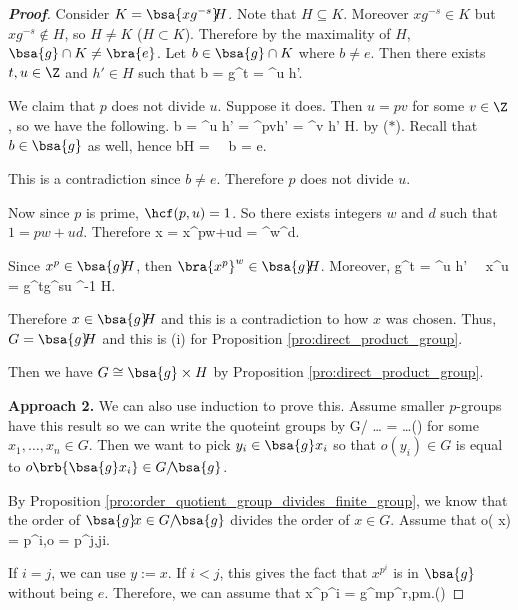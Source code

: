 \begin{proof}[\bf Proof]
Consider $K =\bsa{xg^{-s}}\!\! H$. Note that $H\subseteq K$. Moreover $xg^{-s}\in K$ but $xg^{-s} \notin H$, so $H\neq K$ ($H\subset K$). Therefore by the maximality of $H$, $\bsa{g}\cap K \neq \bra{e}$. Let $b\in \bsa{g}\cap K$ where $b\neq e$. Then there exists $t,u\in \Z$ and $h'\in H$ such that
\be
b = g^t = ^u h'.
\ee

We claim that $p$ does not divide $u$. Suppose it does. Then $u = pv$ for some $v\in \Z$, so we have the following.
\be
b = ^u h' = ^{pv}h' = ^v h' \in H.
\ee
by ($*$). Recall that $b\in \bsa{g}$ as well, hence
\be
b\in {}\cap H =  \ \ra \ b = e.
\ee

This is a contradiction since $b\neq e$. Therefore $p$ does not divide $u$.

Now since $p$ is prime, $\hcf(p,u)=1$. So there exists integers $w$ and $d$ such that $1 = pw+ud$. Therefore
\be
x = x^{pw+ud} = ^w^d.
\ee

Since $x^p \in \bsa{g}\!\! H$, then $\bra{x^p}^w\in \bsa{g}\!\! H$. Moreover,
\be
g^t = ^u h' \ \ra\ x^u = g^tg^{su} ^{-1} \in {}\!\! H.
\ee

Therefore $x\in \bsa{g}\!\! H$ and this is a contradiction to how $x$ was chosen. Thus, $G = \bsa{g}\!\! H$ and this is (i) for Proposition \ref{pro:direct_product_group}. %

Then we have $G\cong \bsa{g}\times H$ by Proposition \ref{pro:direct_product_group}.%

{\bf Approach 2.} We can also use induction to prove this. Assume smaller $p$-groups have this result so we can write the quoteint groups by
\be
G/ \cong {} \times \dots \times {}  =  \times \dots \times {}\qquad (\dag)
\ee
for some $x_1,\dots,x_n\in G$. Then we want to pick $y_i\in \bsa{g}x_i$ so that $o(y_i)\in G$ is equal to $o\brb{\bsa{g}x_i}\in G/\! \bsa{g}$.

By Proposition \ref{pro:order_quotient_group_divides_finite_group}, we know that the order of $\bsa{g}\! x \in G/\!\bsa{g}$ divides the order of $x\in G$. Assume that
\be
o(\! x) = p^i,\quad o = p^j,\qquad j\geq i.
\ee

If $i = j$, we can use $y :=x$. If $i<j$, this gives the fact that $x^{p^i}$ is in $\bsa{g}$ without being $e$. Therefore, we can assume that
\be
x^{p^i} = g^{mp^r},\quad p\nmid m.\qquad(\ddag)
\ee


\end{proof}
